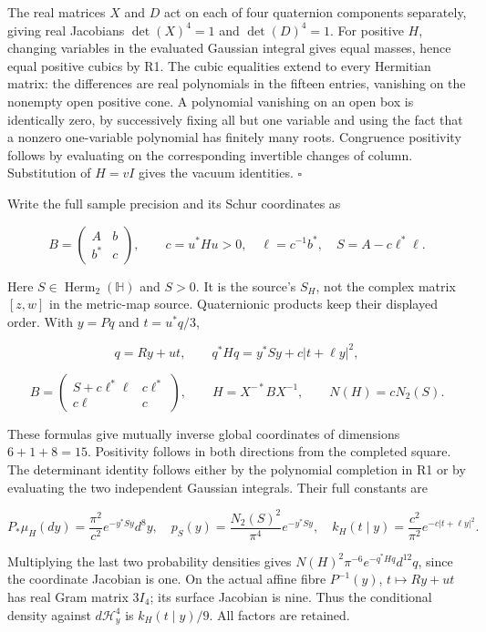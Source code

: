 \documentclass[
  11pt,
]{article}
\begin{document}
The real matrices \(X\) and \(D\) act on each of four quaternion
components separately, giving real Jacobians \(\det(X)^4=1\) and
\(\det(D)^4=1\). For positive \(H\), changing variables in the evaluated
Gaussian integral gives equal masses, hence equal positive cubics by R1.
The cubic equalities extend to every Hermitian matrix: the differences
are real polynomials in the fifteen entries, vanishing on the nonempty
open positive cone. A polynomial vanishing on an open box is identically
zero, by successively fixing all but one variable and using the fact
that a nonzero one-variable polynomial has finitely many roots.
Congruence positivity follows by evaluating on the corresponding
invertible changes of column. Substitution of \(H=vI\) gives the vacuum
identities. \ensuremath{\square}

Write the full sample precision and its Schur coordinates as

\[
B=\begin{pmatrix}A&b\\b^*&c\end{pmatrix},\qquad
c=u^*Hu>0,\quad \ell=c^{-1}b^*,\quad S=A-c\ell^*\ell.
\]

Here \(S\in\operatorname{Herm}_2(\mathbb H)\) and \(S>0\). It is the
source's \(S_H\), not the complex matrix \([z,w]\) in the metric-map
source. Quaternionic products keep their displayed order. With \(y=Pq\)
and \(t=u^*q/3\),

\[
q=Ry+ut,\qquad q^*Hq=y^*Sy+c|t+\ell y|^2,
\]

\[
B=\begin{pmatrix}S+c\ell^*\ell&c\ell^*\\c\ell&c\end{pmatrix},\qquad
H=X^{-*}BX^{-1},\qquad N(H)=cN_2(S).
\]

These formulas give mutually inverse global coordinates of dimensions
\(6+1+8=15\). Positivity follows in both directions from the completed
square. The determinant identity follows either by the polynomial
completion in R1 or by evaluating the two independent Gaussian
integrals. Their full constants are

\[
P_*\mu_H(dy)=\frac{\pi^2}{c^2}e^{-y^*Sy}d^8y,\quad
p_S(y)=\frac{N_2(S)^2}{\pi^4}e^{-y^*Sy},\quad
k_H(t\mid y)=\frac{c^2}{\pi^2}e^{-c|t+\ell y|^2}.
\]

Multiplying the last two probability densities gives
\(N(H)^2\pi^{-6}e^{-q^*Hq}d^{12}q\), since the coordinate Jacobian is
one. On the actual affine fibre \(P^{-1}(y)\), \(t\mapsto Ry+ut\) has
real Gram matrix \(3I_4\); its surface Jacobian is nine. Thus the
conditional density against \(d\mathcal H^4_y\) is \(k_H(t\mid y)/9\).
All factors are retained.
\end{document}
